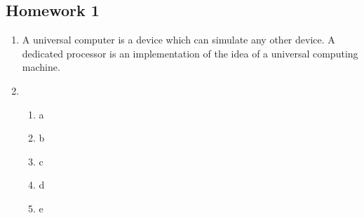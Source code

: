 \documentclass{article}
\begin{document}
\begin{center}
    \section*{Homework 1}
\end{center}

\begin{enumerate}
\item A universal computer is a device which can simulate any other device. A dedicated processor is an implementation of the idea of a universal computing machine.
\item 
  \begin{enumerate}
  \item a
  \item b
  \item c
  \item d
  \item e
  \end{enumerate}
\end{enumerate}
\end{document}
